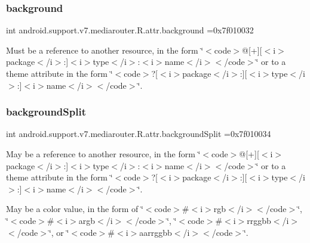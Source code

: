 \subsubsection{\texorpdfstring{background}{background}}
{\footnotesize\ttfamily int android.\+support.\+v7.\+mediarouter.\+R.\+attr.\+background =0x7f010032\hspace{0.3cm}{\ttfamily [static]}}

Must be a reference to another resource, in the form \char`\"{}$<$code$>$@\mbox{[}+\mbox{]}\mbox{[}$<$i$>$package$<$/i$>$\+:\mbox{]}$<$i$>$type$<$/i$>$\+:$<$i$>$name$<$/i$>$$<$/code$>$\char`\"{} or to a theme attribute in the form \char`\"{}$<$code$>$?\mbox{[}$<$i$>$package$<$/i$>$\+:\mbox{]}\mbox{[}$<$i$>$type$<$/i$>$\+:\mbox{]}$<$i$>$name$<$/i$>$$<$/code$>$\char`\"{}. \mbox{\label{classandroid_1_1support_1_1v7_1_1mediarouter_1_1R_1_1attr_a92731fe75f35d0af8080a38400e926dd}} 
\subsubsection{\texorpdfstring{background\+Split}{backgroundSplit}}
{\footnotesize\ttfamily int android.\+support.\+v7.\+mediarouter.\+R.\+attr.\+background\+Split =0x7f010034\hspace{0.3cm}{\ttfamily [static]}}

May be a reference to another resource, in the form \char`\"{}$<$code$>$@\mbox{[}+\mbox{]}\mbox{[}$<$i$>$package$<$/i$>$\+:\mbox{]}$<$i$>$type$<$/i$>$\+:$<$i$>$name$<$/i$>$$<$/code$>$\char`\"{} or to a theme attribute in the form \char`\"{}$<$code$>$?\mbox{[}$<$i$>$package$<$/i$>$\+:\mbox{]}\mbox{[}$<$i$>$type$<$/i$>$\+:\mbox{]}$<$i$>$name$<$/i$>$$<$/code$>$\char`\"{}. 

May be a color value, in the form of \char`\"{}$<$code$>$\#$<$i$>$rgb$<$/i$>$$<$/code$>$\char`\"{}, \char`\"{}$<$code$>$\#$<$i$>$argb$<$/i$>$$<$/code$>$\char`\"{}, \char`\"{}$<$code$>$\#$<$i$>$rrggbb$<$/i$>$$<$/code$>$\char`\"{}, or \char`\"{}$<$code$>$\#$<$i$>$aarrggbb$<$/i$>$$<$/code$>$\char`\"{}. \mbox{\label{classandroid_1_1support_1_1v7_1_1mediarouter_1_1R_1_1attr_a0878fdadbebb45af51c29b96466b0ed5}} 
